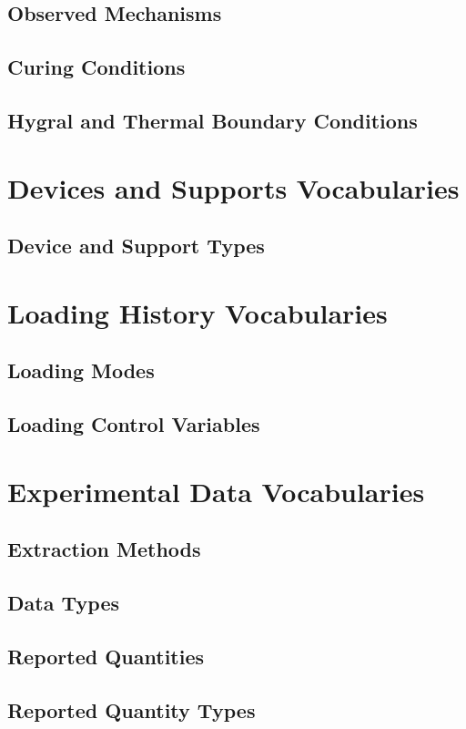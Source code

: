 \subsection{Observed Mechanisms}

\subsection{Curing Conditions}

\subsection{Hygral and Thermal Boundary Conditions}


\section{Devices and Supports Vocabularies}

\subsection{Device and Support Types}


\section{Loading History Vocabularies}

\subsection{Loading Modes}

\subsection{Loading Control Variables}


\section{Experimental Data Vocabularies}

\subsection{Extraction Methods}

\subsection{Data Types}

\subsection{Reported Quantities}

\subsection{Reported Quantity Types}

